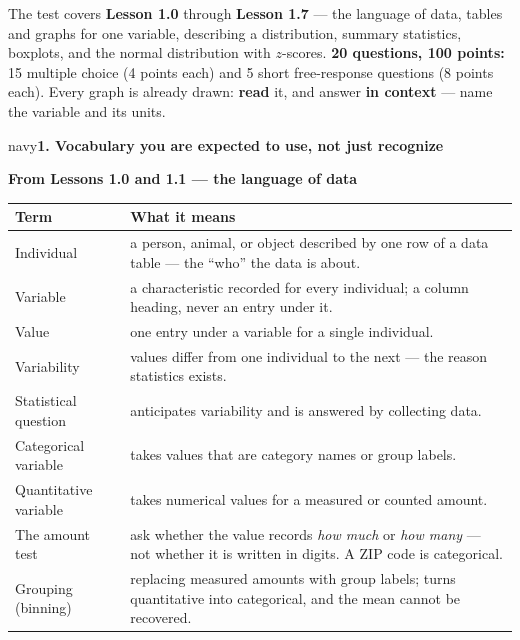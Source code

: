 \documentclass[12pt]{article}
\newcommand{\sghead}[2][10]{%
  \vspace{0.13in}
  \boxguard[#1]
  \begin{headlinebox}{navy}\color{white}\bfseries\small #2\end{headlinebox}
  \vspace{0.09in}}
\newcommand{\vocabhead}[1]{%
  \textbf{#1}\par\vspace{3pt}}
\begin{document}

\vspace{0.12in}

\boxguard[8]
\begin{remindbox}
\small
The test covers \textbf{Lesson 1.0} through \textbf{Lesson 1.7} --- the language of data, tables
and graphs for one variable, describing a distribution, summary statistics, boxplots, and the
normal distribution with $z$-scores. \textbf{20 questions, 100 points:} 15 multiple choice
(4 points each) and 5 short free-response questions (8 points each). Every graph is already
drawn: \textbf{read} it, and answer \textbf{in context} --- name the variable and its units.
\end{remindbox}

\sghead{1. Vocabulary you are expected to use, not just recognize}

\small
\renewcommand{\arraystretch}{1.15}

\vocabhead{From Lessons 1.0 and 1.1 --- the language of data}
\noindent\begin{tabularx}{\linewidth}{@{} l X @{}}
\rowcolor{sky}
\textbf{Term} & \textbf{What it means} \\
\midrule
Individual & a person, animal, or object described by one row of a data table --- the
             ``who'' the data is about. \\
Variable & a characteristic recorded for every individual; a column heading, never an entry
           under it. \\
Value & one entry under a variable for a single individual. \\
Variability & values differ from one individual to the next --- the reason statistics exists. \\
Statistical question & anticipates variability and is answered by collecting data. \\
Categorical variable & takes values that are category names or group labels. \\
Quantitative variable & takes numerical values for a measured or counted amount. \\
The amount test & ask whether the value records \emph{how much} or \emph{how many} --- not
                  whether it is written in digits. A ZIP code is categorical. \\
Grouping (binning) & replacing measured amounts with group labels; turns quantitative into
                     categorical, and the mean cannot be recovered. \\
\end{tabularx}
\end{document}
